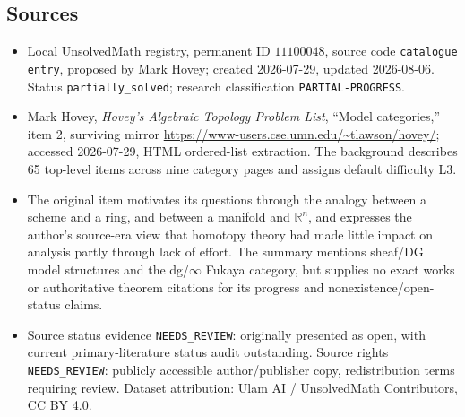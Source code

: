 \documentclass[11pt]{article}
\newcommand{\R}{\mathbb{R}}
\begin{document}
\subsection{Sources}
\begin{itemize}
\item Local UnsolvedMath registry, permanent ID $11100048$, source code \texttt{catalogue entry}, proposed by Mark Hovey; created 2026-07-29, updated 2026-08-06. Status \texttt{partially\_solved}; research classification \texttt{PARTIAL-PROGRESS}.
\item Mark Hovey, \emph{Hovey's Algebraic Topology Problem List}, ``Model categories,'' item 2, surviving mirror \url{https://www-users.cse.umn.edu/~tlawson/hovey/}; accessed 2026-07-29, HTML ordered-list extraction. The background describes 65 top-level items across nine category pages and assigns default difficulty L3.
\item The original item motivates its questions through the analogy between a scheme and a ring, and between a manifold and $\R^n$, and expresses the author's source-era view that homotopy theory had made little impact on analysis partly through lack of effort. The summary mentions sheaf/DG model structures and the dg/$\infty$ Fukaya category, but supplies no exact works or authoritative theorem citations for its progress and nonexistence/open-status claims.
\item Source status evidence \texttt{NEEDS\_REVIEW}: originally presented as open, with current primary-literature status audit outstanding. Source rights \texttt{NEEDS\_REVIEW}: publicly accessible author/publisher copy, redistribution terms requiring review. Dataset attribution: Ulam AI / UnsolvedMath Contributors, CC BY 4.0.
\end{itemize}
\end{document}
